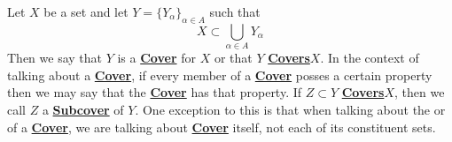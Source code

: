 \newcommand{\Cover}[0]{\textbf{\hyperref[def:Cover]{Cover}}\xspace}
\newcommand{\Covers}[0]{\textbf{\hyperref[def:Cover]{Covers}}\xspace}
\newcommand{\Subcover}[0]{\textbf{\hyperref[def:Cover]{Subcover}}\xspace}
\newcommand{\Subcovers}[0]{\textbf{\hyperref[def:Cover]{Subcovers}}\xspace}
\begin{df}
\label{def:Cover}
\rm
    Let $X$ be a set and let 
    $Y=\{Y_\alpha\}_{\alpha \in A}$ 
    such that 
    \begin{equation*}
        X \subset \bigcup_{\alpha \in A} Y_{\alpha}
    \end{equation*}
    Then we say that 
    $Y$ 
    is a 
    \Cover
    for $X$ 
    or that $Y$ 
    \Covers $X$. 
    In the context of talking about a 
    \Cover, if every member of a 
    \Cover posses a certain property
    then we may say that the \Cover 
    has that property. 
    If $Z \subset Y$ \Covers $X$, then
    we call $Z$ a \Subcover of $Y$. 
    One exception to this is that 
    when talking about the 
    \Cardinality
    or \Disjointedness 
    of a \Cover, we are 
    talking about \Cover itself, 
    not each of its constituent sets. 
\end{df}
